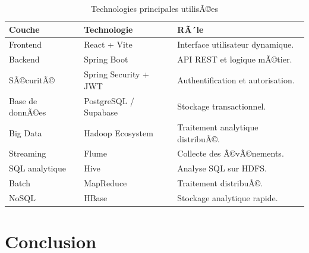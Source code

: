 ﻿\documentclass[12pt,a4paper]{report}
\begin{document}
\begin{table}[H]
    \centering
    \caption{Technologies principales utilisÃ©es}

    \begin{tabular}{|p{4cm}|p{4cm}|p{5cm}|}
        \hline
        \textbf{Couche} & \textbf{Technologie} & \textbf{RÃ´le} \\
        \hline

        Frontend &
        React + Vite &
        Interface utilisateur dynamique. \\
        
        \hline

        Backend &
        Spring Boot &
        API REST et logique mÃ©tier. \\
        
        \hline

        SÃ©curitÃ© &
        Spring Security + JWT &
        Authentification et autorisation. \\
        
        \hline

        Base de donnÃ©es &
        PostgreSQL / Supabase &
        Stockage transactionnel. \\
        
        \hline

        Big Data &
        Hadoop Ecosystem &
        Traitement analytique distribuÃ©. \\
        
        \hline

        Streaming &
        Flume &
        Collecte des Ã©vÃ©nements. \\
        
        \hline

        SQL analytique &
        Hive &
        Analyse SQL sur HDFS. \\
        
        \hline

        Batch &
        MapReduce &
        Traitement distribuÃ©. \\
        
        \hline

        NoSQL &
        HBase &
        Stockage analytique rapide. \\
        
        \hline
    \end{tabular}
\end{table}

\section{Conclusion}
\end{document}

